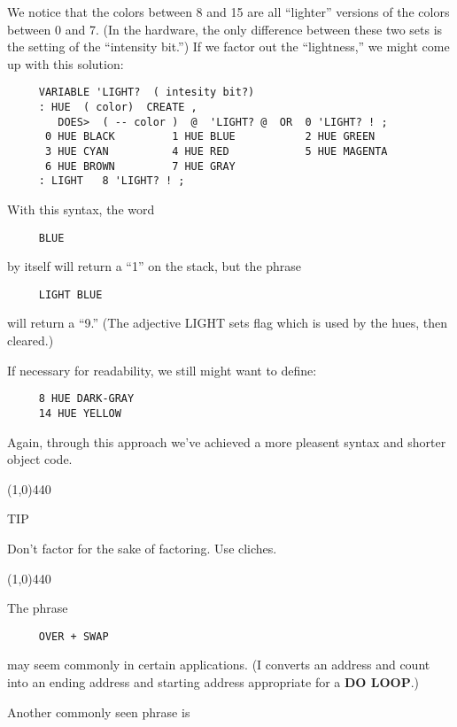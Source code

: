 \documentclass{book}
\begin{document}
We notice that the colors between 8 and 15 are all ``lighter'' versions of the colors between 0 and 7. (In the hardware, the only difference between these two sets is the setting of the ``intensity bit.'') If we factor out the ``lightness,'' we might come up with this solution:

\begin{verbatim}
     VARIABLE 'LIGHT?  ( intesity bit?)
     : HUE  ( color)  CREATE ,
        DOES>  ( -- color )  @  'LIGHT? @  OR  0 'LIGHT? ! ;
      0 HUE BLACK         1 HUE BLUE           2 HUE GREEN
      3 HUE CYAN          4 HUE RED            5 HUE MAGENTA
      6 HUE BROWN         7 HUE GRAY
     : LIGHT   8 'LIGHT? ! ;
\end{verbatim}
     
\noindent     
With this syntax, the word

\begin{verbatim}
     BLUE
\end{verbatim}

\noindent
by itself will return a ``1'' on the stack, but the phrase

\begin{verbatim}
     LIGHT BLUE
\end{verbatim}

\noindent
will return a ``9.'' (The adjective LIGHT sets flag which is used by the hues, then cleared.)

If necessary for readability, we still might want to define:

\begin{verbatim}
     8 HUE DARK-GRAY
     14 HUE YELLOW
\end{verbatim}

\noindent
Again, through this approach we've achieved a more pleasent syntax and shorter object code.

\line(1,0){440} 

TIP 

Don't factor for the sake of factoring. Use cliches.

\line(1,0){440}

\noindent
The phrase

\begin{verbatim}
     OVER + SWAP
\end{verbatim}

\noindent
may seem commonly in certain applications. (I converts an address and count into an ending address and starting address appropriate for a \textbf{DO LOOP}.)

Another commonly seen phrase is
\end{document}
